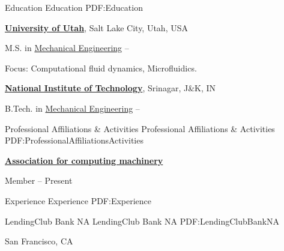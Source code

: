 \documentclass[letterpaper,MMMyyyy,nonstopmode]{simpleresumecv}
\begin{document}
\begin{Body}
\endgroup


\Section
{Education}
{Education}
{PDF:Education}

\Entry
\href{https://www.utah.edu/}
{\textbf{University of Utah}},
Salt Lake City, Utah, USA

\Gap
\BulletItem
M.S. in
\href{https://www.mech.utah.edu/}
{Mechanical Engineering}
\hfill
{} --
\begin{Detail}
\SubBulletItem
Focus:
Computational fluid dynamics, Microfluidics.
\end{Detail}

\BigGap
\Entry
\href{https://nitsri.ac.in/}
{\textbf{National Institute of Technology}},
Srinagar, J\&K, IN

\Gap
\BulletItem
B.Tech. in
\href{https://nitsri.ac.in/Department/Deptindex.aspx?page=a&ItemID=ee&nDeptID=e}
{Mechanical Engineering}
\hfill
{} --


\Section
{Professional Affiliations\newline
\& Activities}
{Professional Affiliations \& Activities}
{PDF:ProfessionalAffiliationsActivities}

\Entry
\href{https://www.acm.org/}
{\textbf{Association for computing machinery}}


\Gap
\BulletItem
Member
\hfill
{} --
Present


\BigGap

\Section
{Experience}
{Experience}
{PDF:Experience}

\SubSection
{LendingClub Bank NA}
{LendingClub Bank NA}
{PDF:LendingClubBankNA}
\par San Francisco, CA


\BigGap


\end{Body}
\end{document}
